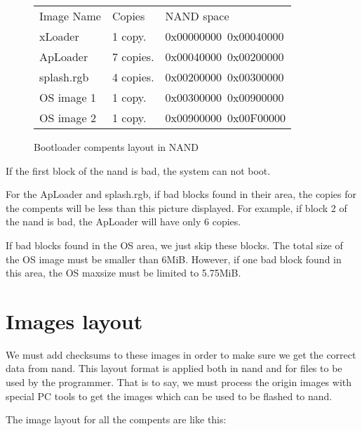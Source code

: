 \documentclass[11pt]{article}
\begin{document}
\begin{figure}[H]
\begin{center}
\begin{footnotesize}
	\begin{longtable}[l]{llp{}}
	Image Name	&	Copies			& NAND space			\\
	xLoader		&	1 copy.			& 0x00000000~0x00040000 \\
	ApLoader	&	7 copies.		& 0x00040000~0x00200000 \\
	splash.rgb	&	4 copies.		& 0x00200000~0x00300000 \\
	OS image 1	&	1 copy.			& 0x00300000~0x00900000 \\
	OS image 2	&	1 copy.			& 0x00900000~0x00F00000 
	\end{longtable}
	\end{footnotesize}
	\caption{Bootloader compents layout in NAND}
	\end{center}
\end{figure}

	If the first block of the nand is bad, the system can not boot.

	For the ApLoader and splash.rgb, if bad blocks found in their area, the copies for
	the compents will be less than this picture displayed. For example, if block 2 of
	the nand is bad, the ApLoader will have only 6 copies. 

	If bad blocks found in the OS area, we just skip these blocks. The total size of the
	OS image must be smaller than 6MiB. However, if one bad block found in this area, the
	OS maxsize must be limited to 5.75MiB.

\section{Images layout}
	We must add checksums to these images in order to make sure we get the correct data
	from nand. This layout format is applied both in nand and for files to be used by
	the programmer. That is to say, we must process the origin images with special PC
	tools to get the images which can be used to be flashed to nand.

	The image layout for all the compents are like this:
	
\end{document}

